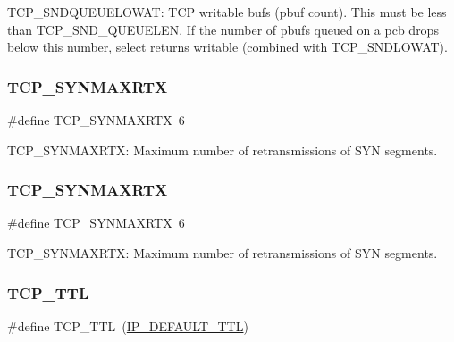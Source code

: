 T\+C\+P\+\_\+\+S\+N\+D\+Q\+U\+E\+U\+E\+L\+O\+W\+AT\+: T\+CP writable bufs (pbuf count). This must be less than T\+C\+P\+\_\+\+S\+N\+D\+\_\+\+Q\+U\+E\+U\+E\+L\+EN. If the number of pbufs queued on a pcb drops below this number, select returns writable (combined with T\+C\+P\+\_\+\+S\+N\+D\+L\+O\+W\+AT). \mbox{\label{group__lwip__opts__tcp_ga50b434a8541a4813f7b27f576c05d1b6}} 
\subsubsection{\texorpdfstring{T\+C\+P\+\_\+\+S\+Y\+N\+M\+A\+X\+R\+TX}{TCP\_SYNMAXRTX}\hspace{0.1cm}{\footnotesize\ttfamily [1/2]}}
{\footnotesize\ttfamily \#define T\+C\+P\+\_\+\+S\+Y\+N\+M\+A\+X\+R\+TX~6}

T\+C\+P\+\_\+\+S\+Y\+N\+M\+A\+X\+R\+TX\+: Maximum number of retransmissions of S\+YN segments. \mbox{\label{group__lwip__opts__tcp_ga50b434a8541a4813f7b27f576c05d1b6}} 
\subsubsection{\texorpdfstring{T\+C\+P\+\_\+\+S\+Y\+N\+M\+A\+X\+R\+TX}{TCP\_SYNMAXRTX}\hspace{0.1cm}{\footnotesize\ttfamily [2/2]}}
{\footnotesize\ttfamily \#define T\+C\+P\+\_\+\+S\+Y\+N\+M\+A\+X\+R\+TX~6}

T\+C\+P\+\_\+\+S\+Y\+N\+M\+A\+X\+R\+TX\+: Maximum number of retransmissions of S\+YN segments. \mbox{\label{group__lwip__opts__tcp_gacd5b25ea81d2894790d25da5393cdab4}} 
\subsubsection{\texorpdfstring{T\+C\+P\+\_\+\+T\+TL}{TCP\_TTL}\hspace{0.1cm}{\footnotesize\ttfamily [1/2]}}
{\footnotesize\ttfamily \#define T\+C\+P\+\_\+\+T\+TL~(\hyperlink{group__lwip__opts__ipv4_ga556b9b58fd02c0fdd126791baef77411}{I\+P\+\_\+\+D\+E\+F\+A\+U\+L\+T\+\_\+\+T\+TL})}

